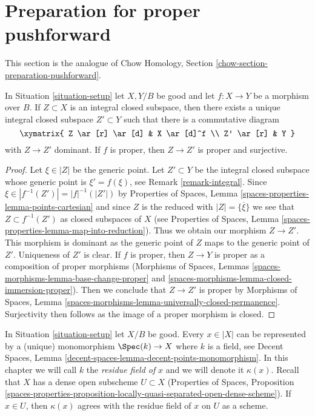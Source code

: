 \section{Preparation for proper pushforward}
\label{section-preparation-pushforward}

\noindent
This section is the analogue of
Chow Homology, Section \ref{chow-section-preparation-pushforward}.

\begin{lemma}
\label{lemma-proper-image}
In Situation \ref{situation-setup} let $X,Y/B$ be good and let $f : X \to Y$
be a morphism over $B$. If $Z \subset X$ is an integral closed subspace, then
there exists a unique integral closed subspace $Z' \subset Y$ such that there
is a commutative diagram
$$
\xymatrix{
Z \ar[r] \ar[d] & X \ar[d]^f \\
Z' \ar[r] & Y
}
$$
with $Z \to Z'$ dominant. If $f$ is proper, then $Z \to Z'$ is proper
and surjective.
\end{lemma}

\begin{proof}
Let $\xi \in |Z|$ be the generic point. Let $Z' \subset Y$ be the integral
closed subspace whose generic point is $\xi' = f(\xi)$, see
Remark \ref{remark-integral}. Since $\xi \in |f^{-1}(Z')| = |f|^{-1}(|Z'|)$
by Properties of Spaces, Lemma \ref{spaces-properties-lemma-points-cartesian}
and since $Z$ is the reduced with $|Z| = \overline{\{\xi\}}$
we see that $Z \subset f^{-1}(Z')$ as closed subspaces of $X$ (see
Properties of Spaces, Lemma \ref{spaces-properties-lemma-map-into-reduction}).
Thus we obtain our morphism $Z \to Z'$.
This morphism is dominant as the generic point of $Z$
maps to the generic point of $Z'$. Uniqueness of $Z'$ is clear.
If $f$ is proper, then $Z \to Y$ is proper as a composition
of proper morphisms (Morphisms of Spaces, Lemmas
\ref{spaces-morphisms-lemma-base-change-proper} and
\ref{spaces-morphisms-lemma-closed-immersion-proper}).
Then we conclude that $Z \to Z'$ is proper by
Morphisms of Spaces, Lemma
\ref{spaces-morphisms-lemma-universally-closed-permanence}.
Surjectivity then follows as the image of a proper morphism is closed.
\end{proof}

\begin{remark}
\label{remark-residue-field}
In Situation \ref{situation-setup} let $X/B$ be good. Every $x \in |X|$
can be represented by a (unique) monomorphism $\Spec(k) \to X$ where
$k$ is a field, see
Decent Spaces, Lemma \ref{decent-spaces-lemma-decent-points-monomorphism}.
In this chapter we will call $k$ the {\it residue field of} $x$ and we
will denote it $\kappa(x)$. Recall that $X$
has a dense open subscheme $U \subset X$ (Properties of Spaces, Proposition
\ref{spaces-properties-proposition-locally-quasi-separated-open-dense-scheme}).
If $x \in U$, then $\kappa(x)$ agrees with the residue
field of $x$ on $U$ as a scheme.
\end{remark}

